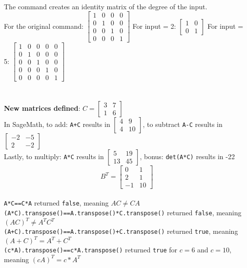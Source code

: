 \documentclass{article}
\begin{document}
\\[0.1in] The command creates an identity matrix of the degree of the input. 
\\For the original command: $\begin{bmatrix}1 & 0 & 0 & 0 \\0 & 1 & 0 & 0 \\0 & 0 & 1 & 0 \\0 & 0 & 0 & 1\end{bmatrix}$ 
For input = 2: $\begin{bmatrix}1 & 0 \\0 & 1\end{bmatrix}$
For input = 5: $\begin{bmatrix}1 & 0 & 0 & 0 & 0 \\0 & 1 & 0 & 0 & 0 \\0 & 0 & 1 & 0 & 0 \\0 & 0 & 0 & 1 & 0 \\0 & 0 & 0 & 0 & 1\end{bmatrix}$
\pagebreak
\section{}
\textbf{New matrices defined}: $C=\begin{bmatrix}3 & 7 \\1 & 6\end{bmatrix}$
\\[0.05in]In SageMath, to add: \verb|A+C| results in $\begin{bmatrix}4 & 9 \\4 & 10\end{bmatrix}$, to subtract \verb|A-C| results in $\begin{bmatrix}-2 & -5 \\2 & -2\end{bmatrix}$
\\[0.05in] Lastly, to multiply: \verb|A*C| results in $\begin{bmatrix}5 & 19 \\13 & 45\end{bmatrix}$, bonus: \verb+det(A*C)+ results in -22
$$B^T=\begin{bmatrix}0 & 1 \\2 & 1 \\-1 & 10\end{bmatrix}$$
\\[0.1in] \verb+A*C==C*A+ returned \verb+false+, meaning $AC\neq CA$
\\[0.1in] \verb+(A*C).transpose()==A.transpose()*C.transpose()+ returned \verb+false+, meaning $(AC)^T\neq A^TC^T$
\\[0.1in] \verb|(A+C).transpose()==A.transpose()+C.transpose()| returned \verb+true+, meaning $(A+C)^T=A^T+C^T$
\\[0.1in] \verb|(c*A).transpose()==c*A.transpose()| returned \verb|true| for $c=6$ and $c=10$, meaning $(cA)^T=c*A^T$
\\[0.1in]
\pagebreak
\section{}
\pagebreak
\section{}
\pagebreak
\section{}
\end{document}
